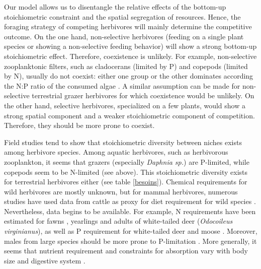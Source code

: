 \documentclass[12pt]{article}
\begin{document}
Our model allows us to disentangle the relative effects of the bottom-up stoichiometric constraint and the spatial segregation of resources. Hence, the foraging strategy of competing herbivores will mainly determine the competitive outcome. On the one hand, non-selective herbivores (feeding on a single plant species or showing a non-selective feeding behavior) will show a strong bottom-up stoichiometric effect. Therefore, coexistence is unlikely. For example, non-selective zooplanktonic filters, such as cladocerans (limited by P) and copepods (limited by N), usually do not coexist: either one group or the other dominates according the N:P ratio of the consumed algae \citep{Andersen1991, Hessen1992, Sterner1992, Elser1996, Koski1999}. A similar assumption can be made for non-selective terrestrial grazer herbivores \citep{Albon1992} for which coexistence would be unlikely. On the other hand, selective herbivores, specialized on a few plants, would show a strong spatial component and a weaker stoichiometric component of competition. Therefore, they should be more prone to coexist. 
\par
Field studies tend to show that stoichiometric diversity between niches exists among herbivore species. Among aquatic herbivores, such as herbivorous zooplankton, it seems that grazers (especially \textit{Daphnia sp.}) are P-limited, while copepods seem to be N-limited (see above). This stoichiometric diversity exists for terrestrial herbivores either (see table \ref{besoins}). Chemical requirements %
for wild herbivores are mostly unknown, but for mammal herbivores, numerous studies have used data from cattle as proxy for diet requirement for wild species \citep{Voeten1999}. Nevertheless, data begins to be available. For example,  N requirements have been estimated for fawns \citep{Smith1975}, yearlings \citep{Holter1979} and adults \citep{Asleson1996} of white-tailed deer (\textit{Odocoileus virginianus}), as well as P requirement for white-tailed deer \citep{Grasman1993} and moose \citep{Schwartz1987}. Moreover, males from large species should be more prone to P-limitation \citep{Grasman1993}. More generally, it seems that nutrient requirement and constraints for absorption vary with body size and digestive system \citep{Janis1976}. 
\end{document}
